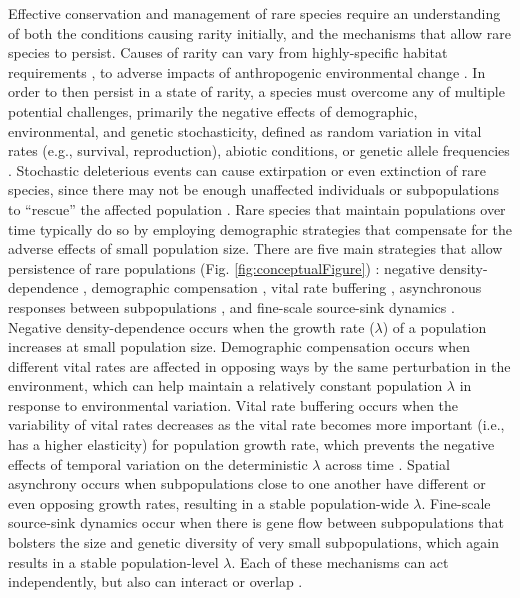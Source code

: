 \documentclass[12pt, letterpaper]{article}
\begin{document}
Effective conservation and management of rare species require an understanding of both the conditions causing rarity initially, and the mechanisms that allow rare species to persist. Causes of rarity can vary from highly-specific habitat requirements \cite{Sgarbi2018YouTime}, to adverse impacts of anthropogenic environmental change \cite{Vincent2020-tz}. In order to then persist in a state of rarity, a species must overcome any of multiple potential challenges, primarily the negative effects of demographic, environmental, and genetic stochasticity, defined as random variation in vital rates (e.g., survival, reproduction), abiotic conditions, or genetic allele frequencies \cite{May1973StabilityEnvironments}. Stochastic deleterious events can cause extirpation or even extinction of rare species, since there may not be enough unaffected individuals or subpopulations to “rescue” the affected population \cite{Nei1975ThePopulations}. Rare species that maintain populations over time typically do so by employing demographic strategies that compensate for the adverse effects of small population size. There are five main strategies that allow persistence of rare populations (Fig. \ref{fig:conceptualFigure}) \cite{Dibner2019}: negative density-dependence \cite{Rovere2019PersistentlyAvoid}, demographic compensation \cite{Villellas2015DemographicImplications}, vital rate buffering \cite{Pfister1998PatternsImplications, Hilde2020TheChallenges}, asynchronous responses between subpopulations \cite{Abbott2017PortfolioWeberi}, and fine-scale source-sink dynamics \cite{Kauffman2004SpatialPopulation, Pulliam2016SourcesUse}. Negative density-dependence occurs when the growth rate ($\lambda$)  of a population increases at small population size. Demographic compensation occurs when different vital rates are affected in opposing ways by the same perturbation in the environment, which can help maintain a relatively constant population $\lambda$ in response to environmental variation. Vital rate buffering occurs when the variability of vital rates decreases as the vital rate becomes more important (i.e., has a higher elasticity) for population growth rate, which prevents the negative effects of temporal variation on the deterministic $\lambda$ across time \cite{Tuljapurkar1989An.}. Spatial asynchrony occurs when subpopulations close to one another have different or even opposing growth rates, resulting in a stable population-wide $\lambda$. Fine-scale source-sink dynamics occur when there is gene flow between subpopulations that bolsters the size and genetic diversity of very small subpopulations, which again results in a stable population-level $\lambda$. Each of these mechanisms can act independently, but also can interact or overlap \cite{Dibner2019}.  
\end{document}
